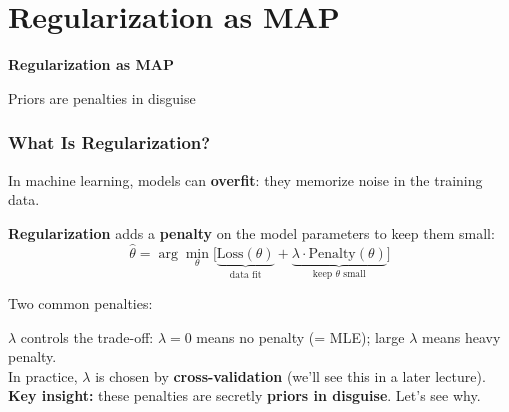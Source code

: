 \documentclass[aspectratio=169]{beamer}
\begin{document}
\section{Regularization as MAP}

\begin{frame}
\begin{center}
  \vspace{2cm}
  {\Huge\bfseries\textcolor{popblue}{Regularization as MAP}}

  \vspace{0.8cm}
  {\large Priors are penalties in disguise}
\end{center}
\end{frame}

\begin{frame}
\frametitle{What Is Regularization?}

\small
In machine learning, models can \textbf{overfit}: they memorize noise in the training data.

\pause
\vspace{0.2cm}
\textbf{Regularization} adds a \textbf{penalty} on the model parameters to keep them small:
$$\hat{\theta} = \arg\min_\theta \bigl[\underbrace{\text{Loss}(\theta)}_{\text{data fit}} + \underbrace{\lambda \cdot \text{Penalty}(\theta)}_{\text{keep } \theta \text{ small}}\bigr]$$

\pause
\vspace{0.1cm}
Two common penalties:

\vspace{0.1cm}
\begin{center}
\end{center}

\pause
\vspace{0.1cm}
\centering\small
$\lambda$ controls the trade-off: $\lambda = 0$ means no penalty (= MLE); large $\lambda$ means heavy penalty.\\[3pt]
In practice, $\lambda$ is chosen by \textbf{cross-validation} (we'll see this in a later lecture).\\[3pt]
\textbf{Key insight:} these penalties are secretly \textbf{priors in disguise}. Let's see why.
\end{frame}
\end{document}
